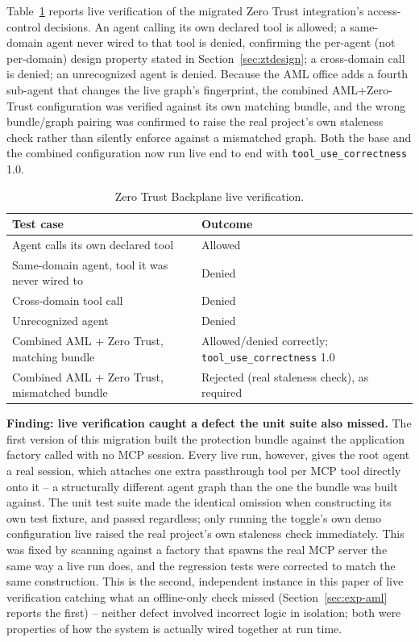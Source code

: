 \documentclass[conference]{IEEEtran}
\begin{document}
Table~\ref{tab:zt} reports live verification of the migrated Zero Trust integration's access-control decisions. An agent calling its own declared tool is allowed; a same-domain agent never wired to that tool is denied, confirming the per-agent (not per-domain) design property stated in Section~\ref{sec:ztdesign}; a cross-domain call is denied; an unrecognized agent is denied. Because the AML office adds a fourth sub-agent that changes the live graph's fingerprint, the combined AML+Zero-Trust configuration was verified against its own matching bundle, and the wrong bundle/graph pairing was confirmed to raise the real project's own staleness check rather than silently enforce against a mismatched graph. Both the base and the combined configuration now run live end to end with \texttt{tool\_use\_correctness} 1.0.

\begin{table}[t]
\centering
\caption{Zero Trust Backplane live verification.}
\label{tab:zt}
\scriptsize
\begin{tabular}{@{}p{3.0cm}p{2.1cm}@{}}
\toprule
Test case & Outcome \\
\midrule
Agent calls its own declared tool & Allowed \\
Same-domain agent, tool it was never wired to & Denied \\
Cross-domain tool call & Denied \\
Unrecognized agent & Denied \\
Combined AML + Zero Trust, matching bundle & Allowed/denied correctly; \texttt{tool\_use\_correctness} 1.0 \\
Combined AML + Zero Trust, mismatched bundle & Rejected (real staleness check), as required \\
\bottomrule
\end{tabular}
\end{table}

\textbf{Finding: live verification caught a defect the unit suite also missed.} The first version of this migration built the protection bundle against the application factory called with no MCP session. Every live run, however, gives the root agent a real session, which attaches one extra passthrough tool per MCP tool directly onto it -- a structurally different agent graph than the one the bundle was built against. The unit test suite made the identical omission when constructing its own test fixture, and passed regardless; only running the toggle's own demo configuration live raised the real project's own staleness check immediately. This was fixed by scanning against a factory that spawns the real MCP server the same way a live run does, and the regression tests were corrected to match the same construction. This is the second, independent instance in this paper of live verification catching what an offline-only check missed (Section~\ref{sec:exp-aml} reports the first) -- neither defect involved incorrect logic in isolation; both were properties of how the system is actually wired together at run time.
\end{document}
